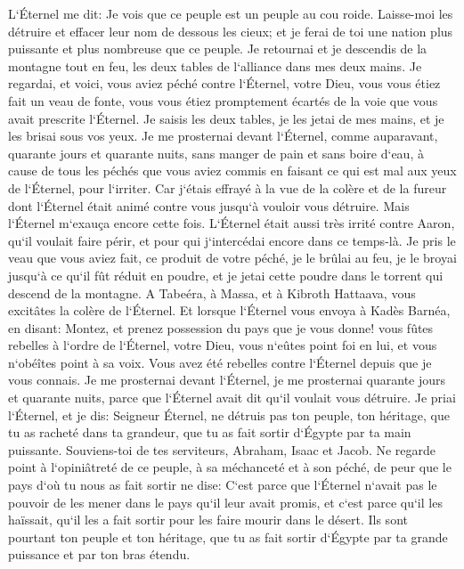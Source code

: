 \verse L`Éternel me dit: Je vois que ce peuple est un peuple au cou roide. 
\verse Laisse-moi les détruire et effacer leur nom de dessous les cieux; et je ferai de toi une nation plus puissante et plus nombreuse que ce peuple. 
\verse Je retournai et je descendis de la montagne tout en feu, les deux tables de l`alliance dans mes deux mains. 
\verse Je regardai, et voici, vous aviez péché contre l`Éternel, votre Dieu, vous vous étiez fait un veau de fonte, vous vous étiez promptement écartés de la voie que vous avait prescrite l`Éternel. 
\verse Je saisis les deux tables, je les jetai de mes mains, et je les brisai sous vos yeux. 
\verse Je me prosternai devant l`Éternel, comme auparavant, quarante jours et quarante nuits, sans manger de pain et sans boire d`eau, à cause de tous les péchés que vous aviez commis en faisant ce qui est mal aux yeux de l`Éternel, pour l`irriter. 
\verse Car j`étais effrayé à la vue de la colère et de la fureur dont l`Éternel était animé contre vous jusqu`à vouloir vous détruire. Mais l`Éternel m`exauça encore cette fois. 
\verse L`Éternel était aussi très irrité contre Aaron, qu`il voulait faire périr, et pour qui j`intercédai encore dans ce temps-là. 
\verse Je pris le veau que vous aviez fait, ce produit de votre péché, je le brûlai au feu, je le broyai jusqu`à ce qu`il fût réduit en poudre, et je jetai cette poudre dans le torrent qui descend de la montagne. 
\verse A Tabeéra, à Massa, et à Kibroth Hattaava, vous excitâtes la colère de l`Éternel. 
\verse Et lorsque l`Éternel vous envoya à Kadès Barnéa, en disant: Montez, et prenez possession du pays que je vous donne! vous fûtes rebelles à l`ordre de l`Éternel, votre Dieu, vous n`eûtes point foi en lui, et vous n`obéîtes point à sa voix. 
\verse Vous avez été rebelles contre l`Éternel depuis que je vous connais. 
\verse Je me prosternai devant l`Éternel, je me prosternai quarante jours et quarante nuits, parce que l`Éternel avait dit qu`il voulait vous détruire. 
\verse Je priai l`Éternel, et je dis: Seigneur Éternel, ne détruis pas ton peuple, ton héritage, que tu as racheté dans ta grandeur, que tu as fait sortir d`Égypte par ta main puissante. 
\verse Souviens-toi de tes serviteurs, Abraham, Isaac et Jacob. Ne regarde point à l`opiniâtreté de ce peuple, à sa méchanceté et à son péché, 
\verse de peur que le pays d`où tu nous as fait sortir ne dise: C`est parce que l`Éternel n`avait pas le pouvoir de les mener dans le pays qu`il leur avait promis, et c`est parce qu`il les haïssait, qu`il les a fait sortir pour les faire mourir dans le désert. 
\verse Ils sont pourtant ton peuple et ton héritage, que tu as fait sortir d`Égypte par ta grande puissance et par ton bras étendu. 

